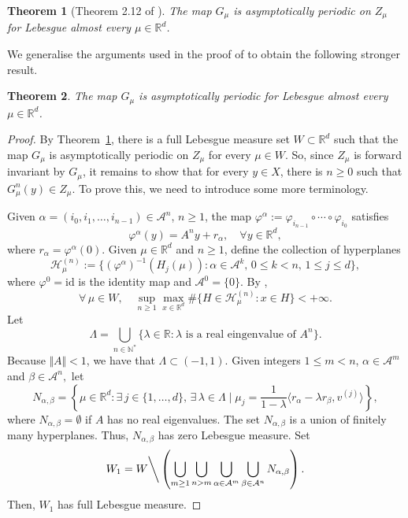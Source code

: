 \documentclass[12pt,reqno,a4paper]{amsart}%
\newtheorem{theorem}{Theorem}
\theoremstyle{definition}
\theoremstyle{remark}
\newcommand{\Rr}{\mathbb{R}}
\begin{document}
{\begin{theorem}[Theorem 2.12 of \cite{GaivaoPires2024}]\label{thm:Gmu}
The map $G_\mu$ is asymptotically periodic on $Z_\mu$ for Lebesgue almost every $\mu\in\Rr^d$.
\end{theorem}

We generalise the arguments used in the proof of  \cite[Corollary 2.13]{GaivaoPires2024} to obtain the following stronger result.

\begin{theorem}\label{thm:Gmu2}
The map $G_\mu$ is asymptotically periodic for Lebesgue almost every $\mu\in\Rr^d$.
\end{theorem}

\begin{proof}
By Theorem~\ref{thm:Gmu}, there is a full Lebesgue measure set $W\subset\Rr^d$ such that the map $G_\mu$ is asymptotically periodic on $Z_\mu$ for every $\mu\in W$. So, {since $Z_\mu$ is forward invariant by $G_\mu$}, it remains to show that for every $y\in X$, there is $n\geq0$ such that $G_\mu^n(y)\in Z_\mu$. To prove {this}, we need to introduce some more terminology.

Given $\alpha= (i_0, i_1,\ldots, i_{n-1})\in\mathcal{A}^n$, $n\ge 1$,  the map $\varphi^{\alpha}:=\varphi_{i_{n-1}}\circ\cdots\circ\varphi_{i_0}$ satisfies
$$ \varphi^{\alpha}(y) = A^{n} y + r_{\alpha},\quad\forall y\in\mathbb{R}^d,
$$
where $r_\alpha =\varphi^\alpha(0)$. Given $\mu\in\Rr^d$ and $n\geq1$, define the collection of hyperplanes
$$
\mathcal{H}_\mu^{(n)}:=\{(\varphi^\alpha)^{-1}(H_j(\mu))\colon \alpha\in\mathcal{A}^k,\,0\leq k<n,\,1\leq j\leq d\},
$$
where $\varphi^0=\mathrm{id}$ is the identity map and $\mathcal{A}^0 = \{0\}$. By \cite[Lemma 5.8]{GaivaoPires2024},  
\begin{equation}\label{eq:bound}
\forall\,\mu\in W,\quad \sup_{n\geq1}\max_{x\in\Rr^d}\#\{H\in\mathcal{H}_\mu^{(n)}\colon x\in H\}<+\infty.
\end{equation}
Let
$$ \Lambda = \bigcup_{n\in\mathbb{N}^*} \{\lambda\in\mathbb{R}: \lambda \textrm{  is {a real} eingenvalue of $A^{n}$}\}.
$$
Because $\Vert A\Vert<1$, we have that
$\Lambda \subset (-1,1)$.
Given integers $1\le m<n$, $\alpha\in\mathcal{A}^{m}$ and $\beta\in\mathcal{A}^{n},$ 
let
$$
N_{\alpha,\beta} = \left\{\mu\in\Rr^d\colon \exists\,j\in\{1,\ldots,d\},\, \exists\,\lambda\in\Lambda \mid \mu_j = \frac{1}{1-\lambda}\langle r_\alpha-\lambda r_\beta,v^{(j)}\rangle \right\},
$$
where $N_{\alpha,\beta}=\emptyset$ if $A$ has no real eigenvalues. The set $N_{\alpha,\beta}$ is a union of finitely many hyperplanes. Thus, $N_{\alpha,\beta}$ has zero Lebesgue measure. 
Set 
$$
W_1 = W{\bigg\backslash}\left( {\bigcup_{m\geq1}\bigcup_{n>m}\bigcup_{\alpha\in\mathcal{A}^m} 
\bigcup_{\beta\in\mathcal{A}^n}
N_{\alpha,\beta}}\right).$$
Then, $W_1$ has full Lebesgue measure.  


\end{proof}}
\end{document}
